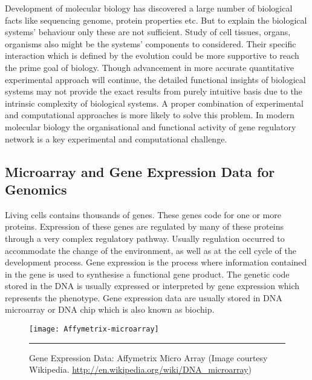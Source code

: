 Development of molecular biology has discovered a large number of biological facts like sequencing genome, protein properties etc. But to explain the biological systems' behaviour only these are not sufficient. Study of cell tissues, organs, organisms also might be the systems' components to considered. Their specific interaction which is defined by the evolution could be more supportive to reach the prime goal of biology. Though advancement in more accurate quantitative experimental approach will continue, the detailed functional insights of biological systems may not provide the exact results from purely intuitive basis due to the intrinsic complexity of biological systems. A proper combination of experimental and computational approaches is more likely to solve this problem. In modern molecular biology the organisational and functional activity of gene regulatory network is a key experimental and computational challenge.

\subsection{Microarray and Gene Expression Data for Genomics }
Living cells contains thousands of genes. These genes code for one or more proteins. Expression of these genes are regulated by many of these proteins through a very complex regulatory pathway. Usually regulation occurred to accommodate the change of the environment, as well as at the cell cycle of the development process. %
Gene expression is the process where information contained in the gene is used to synthesise a functional gene product. The genetic code stored in the DNA is usually expressed or interpreted by gene expression which represents the  phenotype. Gene expression data are usually stored in DNA microarray or DNA chip which is also known as biochip. 

\begin{figure}[htbp!]
	\centering
	\texttt{[image: Affymetrix-microarray]}
		\rule{35em}{0.5pt}
	\caption[Affymetrix Micro Array]{Gene Expression Data: Affymetrix Micro Array
	(Image courtesy Wikipedia. 
	\url{http://en.wikipedia.org/wiki/DNA_microarray})}
	\label{fig:Affymetrix-microarray}
\end{figure}
 
